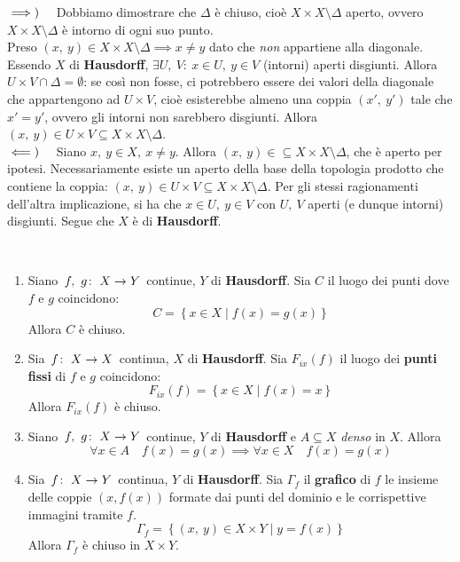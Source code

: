 \begin{demonstration}
	$\implies)\quad$ Dobbiamo dimostrare che $\Delta$ è chiuso, cioè $X\times X\setminus \Delta$ aperto, ovvero $X\times X\setminus \Delta$ è intorno di ogni suo punto.\\
	Preso $\left(x,\ y\right)\in X\times X\setminus \Delta\implies x\neq y$ dato che \textit{non} appartiene alla diagonale. Essendo $X$ di \textbf{Hausdorff}, $\exists U,\ V:\ x\in U,\ y\in V$ (intorni) aperti  disgiunti. Allora $U\times V\cap \Delta =\emptyset$: se così non fosse, ci potrebbero essere dei valori della diagonale che appartengono ad $U\times V$, cioè esisterebbe almeno una coppia $\left(x',\ y'\right)$ tale che $x'=y'$, ovvero gli intorni non sarebbero disgiunti. Allora $\left(x,\ y\right)\in U\times V\subseteq X\times X\setminus \Delta$.\\
	$\impliedby)\quad$ Siano $x,\ y\in X,\ x\neq y$. Allora $\left(x,\ y\right)\in \subseteq X\times X\setminus \Delta$, che è aperto per ipotesi. Necessariamente esiste un aperto della base della topologia prodotto che contiene la coppia: $\left(x,\ y\right)\in U\times V\subseteq X\times X\setminus \Delta$. Per gli stessi ragionamenti dell'altra implicazione, si ha che $x\in U,\ y\in V$ con $U,\ V$ aperti (e dunque intorni) disgiunti. Segue che $X$ è di \textbf{Hausdorff}.
\end{demonstration}
\begin{proposition}~{}
	\begin{enumerate}
		\item Siano $\funz{f,\ g}{X}{Y}$ continue, $Y$ di \textbf{Hausdorff}. Sia $C$ il luogo dei punti dove $f$ e $g$ coincidono:
		\begin{equation}
			C=\left\{x\in X\mid f\left(x\right)=g\left(x\right)\right\}
		\end{equation}
		Allora $C$ è chiuso.
		\item  Sia $\funz{f}{X}{X}$ continua, $X$ di \textbf{Hausdorff}.  Sia $F_{ix}\left(f\right)$ il luogo dei \textbf{punti fissi} di $f$ e $g$ coincidono:
		\begin{equation}
			F_{ix}\left(f\right)=\left\{x\in X\mid f\left(x\right)=x\right\}
		\end{equation}
		Allora $F_{ix}\left(f\right)$ è chiuso.
		\item Siano $\funz{f,\ g}{X}{Y}$ continue, $Y$ di \textbf{Hausdorff} e $A\subseteq X$ \textit{denso} in $X$. Allora
		\begin{equation}
			\forall x\in A\quad f\left(x\right)=g\left(x\right)\implies \forall x\in X\quad f\left(x\right)=g\left(x\right)
		\end{equation}
		\item Sia $\funz{f}{X}{Y}$ continua, $Y$ di \textbf{Hausdorff}. Sia $\Gamma_f$ il \textbf{grafico} di $f$ le insieme delle coppie $(x,f\left(x\right))$ formate dai punti del dominio e le corrispettive immagini tramite $f$.
		\begin{equation}
			\Gamma_f=\left\{\left(x,\ y\right)\in X\times Y\mid y=f\left(x\right)\right\}
		\end{equation}
		Allora $\Gamma_f$ è chiuso in $X\times Y$.
	\end{enumerate}
\end{proposition}

